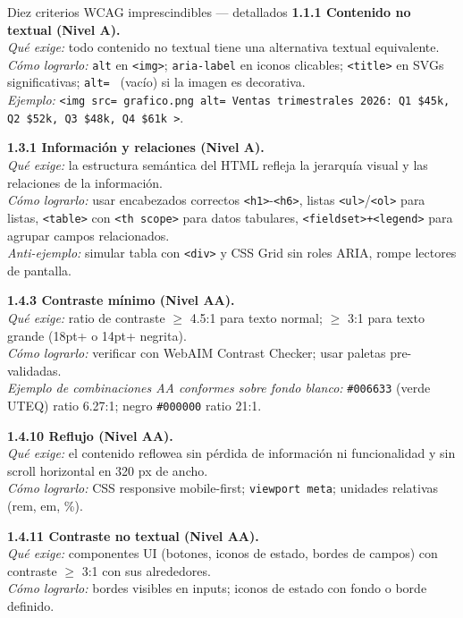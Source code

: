 \begin{cajabuenas}{Diez criterios WCAG imprescindibles --- detallados}
\textbf{1.1.1 Contenido no textual (Nivel A).}\\
\emph{Qué exige:} todo contenido no textual tiene una alternativa
textual equivalente.\\
\emph{Cómo lograrlo:} \texttt{alt} en \texttt{<img>};
\texttt{aria-label} en iconos clicables; \texttt{<title>} en SVGs
significativas; \texttt{alt=  } (vacío) si la imagen es decorativa.\\
\emph{Ejemplo:} \texttt{<img src= grafico.png  alt= Ventas
trimestrales 2026: Q1 \$45k, Q2 \$52k, Q3 \$48k, Q4 \$61k >}.

\textbf{1.3.1 Información y relaciones (Nivel A).}\\
\emph{Qué exige:} la estructura semántica del HTML refleja la
jerarquía visual y las relaciones de la información.\\
\emph{Cómo lograrlo:} usar encabezados correctos
\texttt{<h1>}-\texttt{<h6>}, listas \texttt{<ul>}/\texttt{<ol>} para
listas, \texttt{<table>} con \texttt{<th scope>} para datos
tabulares, \texttt{<fieldset>+<legend>} para agrupar campos
relacionados.\\
\emph{Anti-ejemplo:} simular tabla con \texttt{<div>} y CSS Grid sin
roles ARIA, rompe lectores de pantalla.

\textbf{1.4.3 Contraste mínimo (Nivel AA).}\\
\emph{Qué exige:} ratio de contraste $\geq$ 4.5:1 para texto normal;
$\geq$ 3:1 para texto grande (18pt+ o 14pt+ negrita).\\
\emph{Cómo lograrlo:} verificar con WebAIM Contrast Checker; usar
paletas pre-validadas.\\
\emph{Ejemplo de combinaciones AA conformes sobre fondo blanco:}
\texttt{\#006633} (verde UTEQ) ratio 6.27:1; negro
\texttt{\#000000} ratio 21:1.

\textbf{1.4.10 Reflujo (Nivel AA).}\\
\emph{Qué exige:} el contenido reflowea sin pérdida de información ni
funcionalidad y sin scroll horizontal en 320 px de ancho.\\
\emph{Cómo lograrlo:} CSS responsive mobile-first;
\texttt{viewport meta}; unidades relativas (rem, em, \%).

\textbf{1.4.11 Contraste no textual (Nivel AA).}\\
\emph{Qué exige:} componentes UI (botones, iconos de estado, bordes
de campos) con contraste $\geq$ 3:1 con sus alrededores.\\
\emph{Cómo lograrlo:} bordes visibles en inputs; iconos de estado
con fondo o borde definido.


\end{cajabuenas}
